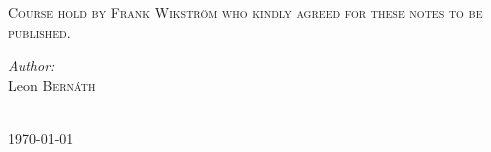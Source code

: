 \begin{titlepage}
    \textsc{\large Course hold by Frank Wikström who kindly agreed for these notes to be published.}\\[1.5cm] %


    \begin{minipage}{0.5\textwidth}
      \begin{flushleft} \large
        \emph{Author:}\\
        Leon \textsc{Bernáth} \\
      \end{flushleft}

    \end{minipage}\\[2cm]



    {\large \today}\\[2cm] %

    \vfill %

  \end{titlepage}

